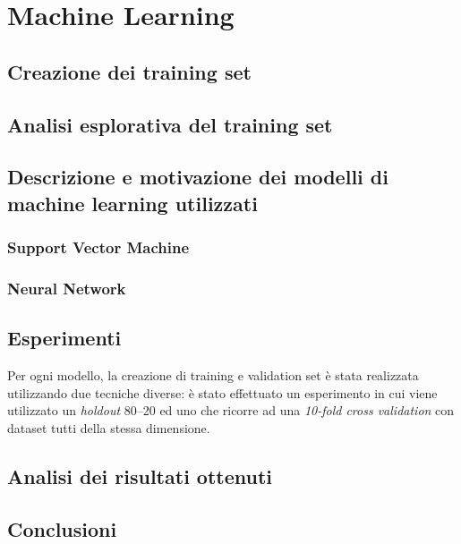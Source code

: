 \setcounter{chapter}{0}
\part{Machine Learning}
\chapter{Creazione dei training set}

\chapter{Analisi esplorativa del training set}

\chapter{Descrizione e motivazione dei modelli di machine learning utilizzati}


\section{Support Vector Machine}

\section{Neural Network}

\chapter{Esperimenti}
Per ogni modello, la creazione di training e validation set è stata realizzata 
utilizzando due tecniche diverse: è stato effettuato un esperimento in cui 
viene utilizzato un \textit{holdout} 80--20 ed uno che ricorre ad una 
\textit{10-fold cross validation} con dataset tutti della stessa dimensione.



\chapter{Analisi dei risultati ottenuti}

\chapter{Conclusioni}
